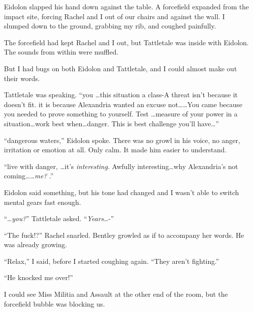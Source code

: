 Eidolon slapped his hand down against the table.  A forcefield expanded from the impact site, forcing Rachel and I out of our chairs and against the wall.  I slumped down to the ground, grabbing my rib, and coughed painfully.



The forcefield had kept Rachel and I out, but Tattletale was inside with Eidolon.  The sounds from within were muffled.



But I had bugs on both Eidolon and Tattletale, and I could almost make out their words.



Tattletale was speaking.  ``\ldotsreason you \ldots this situation a class-A threat isn't because it doesn't fit.  \ldotsdid it is because Alexandria wanted an excuse not\ldots \ldots  You came because you needed to prove something to yourself.  Test \ldots measure of your power in a \ldotsnse situation\ldots work best when\ldots danger.  This is best challenge you'll have\ldots''



``\ldotstreading dangerous waters,'' Eidolon spoke.  There was no growl in his voice, no anger, irritation or emotion at all.  Only calm.  It made him easier to understand.



``\ldotscan live with danger, \ldots it's \emph{interesting.  }Awfully interesting\ldots why Alexandria's not coming\ldots \ldots \emph{me?}  \ldotssecret.''



Eidolon said something, but his tone had changed and I wasn't able to switch mental gears fast enough.



``\ldots\emph{you?}''  Tattletale asked. ``\emph{Years\ldots}-''



``The fuck!?'' Rachel snarled.  Bentley growled as if to accompany her words.  He was already growing.



``Relax,'' I said, before I started coughing again.  ``They aren't fighting.''



``He knocked me over!''



I could see Miss Militia and Assault at the other end of the room, but the forcefield bubble was blocking us.



